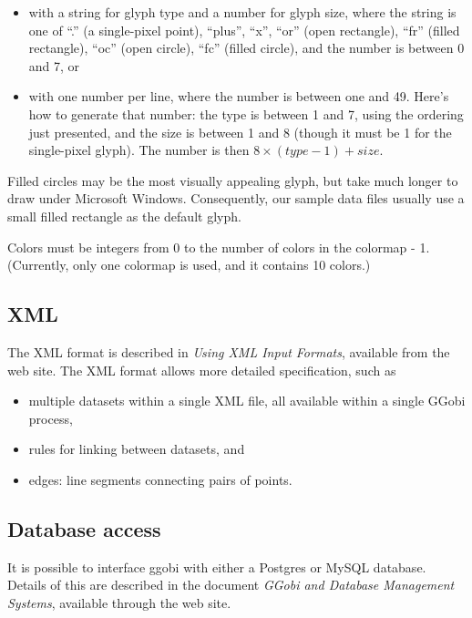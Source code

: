 \documentclass[11pt]{article}
\begin{document}
\begin{itemize}
\item with a string for glyph type and a number for glyph size, where the
string is one of ``.'' (a single-pixel point), ``plus'', ``x'', ``or''
(open rectangle), ``fr'' (filled rectangle), ``oc'' (open circle), ``fc''
(filled circle),
 and the number is between 0 and 7, or
\item with one number per line, where the number is between one and
49.  Here's how to generate that number: the type is between 1 and 7,
using the ordering just presented, and the size is between 1 and 8
(though it must be 1 for the single-pixel glyph).  The number is then
$8 \times (type-1) + size$.
\end{itemize}

Filled circles may be the most visually appealing glyph, but take
much longer to draw under Microsoft Windows.  Consequently, our
sample data files usually use a small filled rectangle as the default
glyph.

Colors must be integers from 0 to the number of colors in
the colormap - 1.  (Currently, only one colormap is used, and it
contains 10 colors.)

\subsection {XML}
\label{slbl:XML}

The XML format is described in {\em Using XML Input Formats},
available from the web site.  The XML format allows more detailed
specification, such as

\begin{itemize}
\item multiple datasets within a single XML file, all available within
      a single GGobi process,
\item rules for linking between datasets, and
\item edges: line segments connecting pairs of points.
\end{itemize}

\subsection {Database access}
\label{slbl:MySQL}

It is possible to interface ggobi with either a Postgres or MySQL
database. Details of this are described in the document {\em GGobi and
  Database Management Systems}, available through the web site. 
\end{document}
